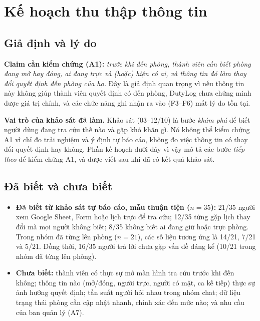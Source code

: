 \section{Kế hoạch thu thập thông tin}
\subsection{Giả định và lý do}
\textbf{Claim cần kiểm chứng (A1):} \emph{trước khi đến phòng, thành viên cần biết phòng đang mở hay đóng, ai đang trực và (hoặc) hiện có ai, và thông tin đó làm thay đổi quyết định đến phòng của họ.} Đây là giả định quan trọng vì nếu thông tin này không giúp thành viên quyết định có đến phòng, DutyLog chưa chứng minh được giá trị chính, và các chức năng ghi nhận ra vào (F3--F6) mất lý do tồn tại.

\textbf{Vai trò của khảo sát đã làm.} Khảo sát (03--12/10) là bước \emph{khám phá} để biết người dùng đang tra cứu thế nào và gặp khó khăn gì. Nó không thể kiểm chứng A1 vì chỉ đo trải nghiệm và ý định tự báo cáo, không đo việc thông tin có thay đổi quyết định hay không. Phần kế hoạch dưới đây vì vậy mô tả các bước \emph{tiếp theo} để kiểm chứng A1, và được viết sau khi đã có kết quả khảo sát.

\subsection{Đã biết và chưa biết}
\begin{itemize}
    \item \textbf{Đã biết từ khảo sát tự báo cáo, mẫu thuận tiện ($n=35$):} 21/35 người xem Google Sheet, Form hoặc lịch trực để tra cứu; 12/35 từng gặp lịch thay đổi mà mọi người không biết; 8/35 không biết ai đang giữ hoặc trực phòng. Trong nhóm đã từng lên phòng ($n=21$), các số liệu tương ứng là 14/21, 7/21 và 5/21. Đồng thời, 16/35 người trả lời chưa gặp vấn đề đáng kể (10/21 trong nhóm đã từng lên phòng).
    \item \textbf{Chưa biết:} thành viên có thực sự mở màn hình tra cứu trước khi đến không; thông tin nào (mở/đóng, người trực, người có mặt, ca kế tiếp) thực sự ảnh hưởng quyết định; tần suất người hỏi nhau trong nhóm chat; dữ liệu trạng thái phòng cần cập nhật nhanh, chính xác đến mức nào; và nhu cầu của ban quản lý (A7).
\end{itemize}

